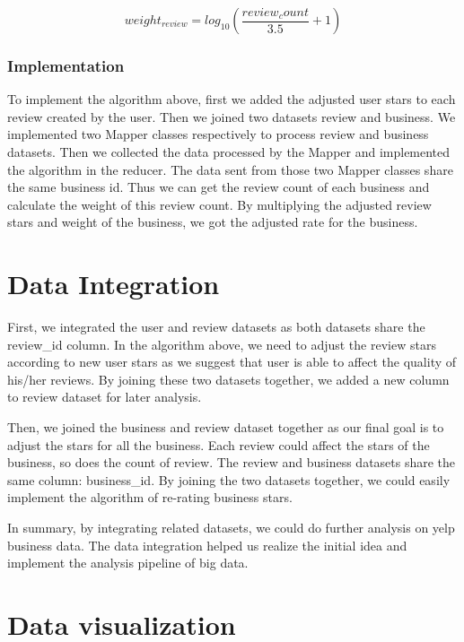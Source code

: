 \documentclass{stylefiles/capstone}
\begin{document}
\begin{equation}
weight_{review}= log_{10}(\frac{review_count}{3.5}+1)
\label{review_weight}
\end{equation}

\subsubsection{Implementation}
To implement the algorithm above, first we added the adjusted user stars to each review created by the user. Then we joined two datasets review and business. We implemented two Mapper classes respectively to process review and business datasets. Then we collected the data processed by the Mapper and implemented the algorithm in the reducer. The data sent from those two Mapper classes share the same business id. Thus we can get the review count of each business and calculate the weight of this review count. By multiplying the adjusted review stars and weight of the business, we got the adjusted rate for the business.
\section{Data Integration}

First, we integrated the user and review datasets as both datasets share the review\_id column. In the algorithm above, we need to adjust the review stars according to new user stars as we suggest that user is able to affect the quality of his/her reviews. By joining these two datasets together, we added a new column to review dataset for later analysis. 

Then, we joined the business and review dataset together as our final goal is to adjust the stars for all the business. Each review could affect the stars of the business, so does the count of review. The review and business datasets share the same column: business\_id. By joining the two datasets together, we could easily implement the algorithm of re-rating business stars. 

In summary, by integrating related datasets, we could do further analysis on yelp business data. The data integration helped us realize the initial idea and implement the analysis pipeline of big data.

\section{Data visualization}
\end{document}
